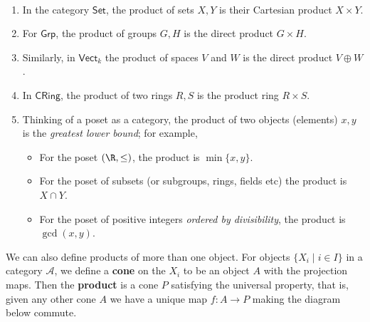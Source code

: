 \begin{example}
    \,
    \begin{enumerate}[label=(\alph*)]
    \item In the category $\mathsf{Set} $, the product of sets $X,Y$ is their Cartesian product $X\times Y$.
    \item For $\mathsf{Grp} $, the product of groups  $G,H$ is the direct product $G\times H$.
    \item Similarly, in $\mathsf{Vect} _k$ the product of spaces $V$ and $W$ is the direct product $V\oplus W$.
    \item In $\mathsf{CRing} $, the product of two rings $R,S$ is the product ring $R\times S$.
    \item Thinking of a poset as a category, the product of two objects (elements) $x,y$ is the \emph{greatest lower bound}; for example,
        \begin{itemize}
            \item For the poset $(\R,\leq)$, the product is $\operatorname{min}\{x,y\} $.
            \item For the poset of subsets (or subgroups, rings, fields etc) the product is $X\cap Y$.
            \item For the poset of positive integers \emph{ordered by divisibility}, the product is $\gcd(x,y)$.
        \end{itemize}
\end{enumerate}
\end{example}
We can also define products of more than one object. For objects $\{X_i  \mid i\in I\} $ in a category $\mathcal{A} $, we define a \textbf{cone} on the $X_i $ to be an object $A$ with the projection maps. Then the \textbf{product} is a cone $P$ satisfying the universal property, that is, given any other cone $A$ we have a unique map $f\colon A \to P$ making the diagram below commute. 
